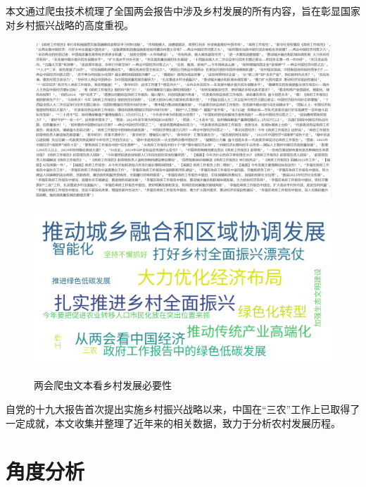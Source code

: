 本文通过爬虫技术梳理了全国两会报告中涉及乡村发展的所有内容，旨在彰显国家对乡村振兴战略的高度重视。
\begin{figure}[H]
    \centering
    \begin{minipage}{0.5\textwidth}
        \centering
        \includegraphics[width=\linewidth]{figures/33.png}
        
        \label{fig:enter-label}
    \end{minipage}\hfill
    \begin{minipage}{0.5\textwidth}
        \centering
        \includegraphics[width=\linewidth]{figures/6.png}
        
        \label{fig:TwoSessions}
    \end{minipage}
    \caption{两会爬虫文本看乡村发展必要性}
\end{figure}

自党的十九大报告首次提出实施乡村振兴战略以来，中国在“三农”工作上已取得了一定成就，本文收集并整理了近年来的相关数据，致力于分析农村发展历程。

\section{角度分析}

